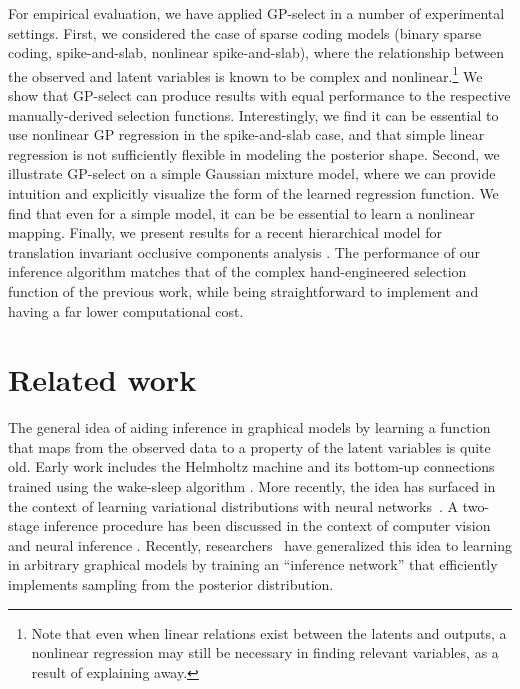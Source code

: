 \documentclass[12pt]{article}
\begin{document}
For empirical evaluation, we have applied GP-select in a number of experimental settings.
First, we considered the case of sparse coding models (binary sparse coding,
spike-and-slab, nonlinear spike-and-slab), where the relationship between the
observed and latent variables is known to be complex and nonlinear.\footnote{Note that
 even when linear relations exist between the latents and outputs, a nonlinear
regression may still be necessary in finding relevant variables,
as a result of explaining away.}
%
We show that GP-select can produce results with equal performance to the respective manually-derived selection functions.
%
Interestingly, we find it can be essential to use nonlinear GP regression
in the spike-and-slab case, and that simple linear regression is not
sufficiently flexible in modeling the posterior shape.
%
Second, we illustrate GP-select on a simple Gaussian mixture model,
where we can provide intuition and explicitly visualize the form of the learned regression function.
We find that even for a simple model, it can be be essential to learn a nonlinear mapping.
Finally, we present results
for a recent hierarchical model for translation invariant occlusive components analysis
\citep{DaiLucke2014}.
The performance of our inference algorithm matches that of the complex
hand-engineered selection function of the previous work, while being straightforward
to implement and having a far lower computational cost.

\section{Related work}

The general idea of aiding inference in graphical models by
learning a function that maps from the observed data to
a property of the latent variables is quite old. Early work includes the
Helmholtz machine \citep{Dayan95} and its bottom-up connections trained using the wake-sleep
algorithm \citep{HintonEtAl1995}.
More recently, the idea has surfaced in the context of learning variational distributions with neural networks~\citep{WellingICML2014}.
A two-stage inference procedure has  been discussed in the context of
computer vision \citep{YuilleKersten2006} and neural inference \citep{KoernerEtAl1999}.
Recently, researchers~\citep{MnihGregor2014} 
have generalized this idea to learning in arbitrary graphical models by training
an ``inference network'' that efficiently implements sampling from the posterior
distribution.
\end{document}
